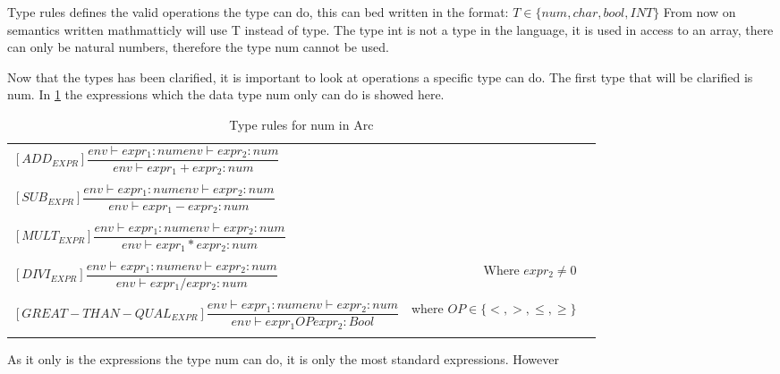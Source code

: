 Type rules defines the valid operations the type can do, this can bed written in the format:
$T \in \{num, char, bool, INT\}$
From now on semantics written mathmatticly will use T instead of type. The type int is not a type in the language, it is used in access to an array, there can only be natural numbers, therefore the type num cannot be used.

Now that the types has been clarified, it is important to look at operations a specific type can do.
The first type that will be clarified is num.
In \ref{tab:num-rules} the expressions which the data type num only can do is showed here.

\begin{table}[htb!]
    \centering
    \begin{tabular}{lr>{\raggedright\arraybackslash}p{6cm}}
        $[ADD_{EXPR}] \dfrac
            {env\vdash expr_1: num env\vdash expr_2: num}
            {env\vdash expr_1 +expr_2: num}$
        \\
        \\
        $[SUB_{EXPR}] \dfrac
            {env\vdash expr_1: num env\vdash expr_2: num}
            {env\vdash expr_1 -expr_2: num}$
        \\
        \\
        $[MULT_{EXPR}] \dfrac
            {env\vdash expr_1: num env\vdash expr_2: num}
            {env\vdash expr_1 *expr_2: num}$
        \\
        \\
        $[DIVI_{EXPR}] \dfrac
            {env\vdash expr_1: num env\vdash expr_2: num}
        {env\vdash expr_1 /expr_2: num}$    & Where $expr_2 \neq 0$
        \\
        \\
        $[GREAT-THAN-QUAL_{EXPR}] \dfrac
            {env\vdash expr_1: num env\vdash expr_2: num}
        {env\vdash expr_1 OP expr_2: Bool}$ & where $OP \in \{<, >, \leq, \geq\}$
        \\
        \\
    \end{tabular}
    \caption{Type rules for num in Arc}
    \label{tab:num-rules}
\end{table}
As it only is the expressions the type num can do, it is only the most standard expressions.
However
